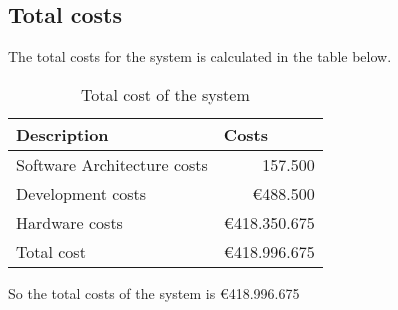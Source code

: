 \subsection{Total costs}
The total costs for the system is calculated in the table below.\\

\begin{table}[H]

	\centering
	\begin{tabular}{lr}
	\toprule
	\textbf{Description} & \multicolumn{1}{l}{\textbf{Costs}} \\ \hline
	Software Architecture costs & \EUR{}157.500\\
	Development costs & $\euro{}$488.500\\
	Hardware costs & $\euro{}$418.350.675\\
	Total cost & $\euro{}$418.996.675\\
	
	
	\bottomrule
	\end{tabular}
	\caption{Total cost of the system}
	\label{table:totalcosts}
\end{table}
So the total costs of the system is $\euro{}$418.996.675\\


